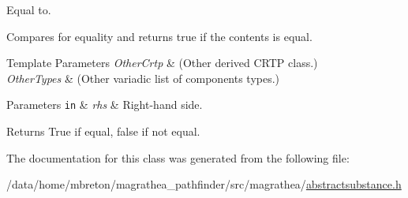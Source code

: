 Equal to. 

Compares for equality and returns true if the contents is equal. 
\begin{DoxyTemplParams}{Template Parameters}
{\em Other\-Crtp} & (Other derived C\-R\-T\-P class.) \\
\hline
{\em Other\-Types} & (Other variadic list of components types.) \\
\hline
\end{DoxyTemplParams}

\begin{DoxyParams}[1]{Parameters}
\mbox{\tt in}  & {\em rhs} & Right-\/hand side. \\
\hline
\end{DoxyParams}
\begin{DoxyReturn}{Returns}
True if equal, false if not equal. 
\end{DoxyReturn}


The documentation for this class was generated from the following file\-:\begin{DoxyCompactItemize}
\item 
/data/home/mbreton/magrathea\-\_\-pathfinder/src/magrathea/\hyperlink{abstractsubstance_8h}{abstractsubstance.\-h}\end{DoxyCompactItemize}
